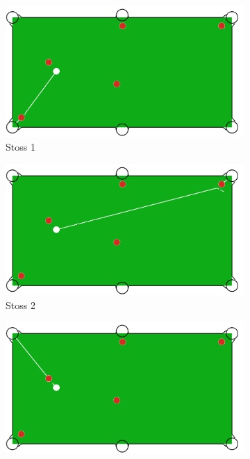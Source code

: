 \begin{figure}[h!]
    \centering
    \begin{subfigure}[b]{0.3\textwidth}
        \centering
        \includegraphics[width=1.0\linewidth]{../common/04_results/resources/simple_search/situation_diverse_solution_rail_1.PNG}
        \caption{Stoss 1}
        \label{fig:situation_rail_1_solution_1}
    \end{subfigure}
    \hfill
    \begin{subfigure}[b]{0.3\textwidth}
        \centering
        \includegraphics[width=1.0\linewidth]{../common/04_results/resources/simple_search/situation_diverse_solution_rail_2.PNG}
        \caption{Stoss 2}
        \label{fig:situation_rail_1_solution_2}
    \end{subfigure}
    \hfill
    \begin{subfigure}[b]{0.3\textwidth}
        \centering
        \includegraphics[width=1.0\linewidth]{../common/04_results/resources/simple_search/situation_diverse_solution_rail_3.PNG}

\end{subfigure}
\end{figure}

